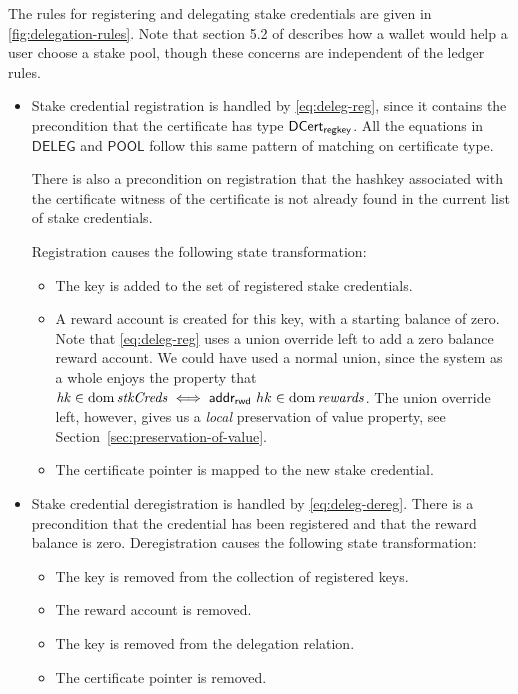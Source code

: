 The rules for registering and delegating stake credentials are given in
\cref{fig:delegation-rules}.  Note that section 5.2 of \cite{delegation_design}
describes how a wallet would help a user choose a stake pool, though these
concerns are independent of the ledger rules.

\begin{itemize}
\item Stake credential registration is handled by \cref{eq:deleg-reg}, since it
  contains the precondition that the certificate has type $\mathsf{DCert_{regkey}}$.  All
  the equations in $\mathsf{DELEG}$ and $\mathsf{POOL}$ follow this same pattern
  of matching on certificate type.

  There is also a precondition on registration that the hashkey associated with
  the certificate witness of the certificate is not already found in the current
  list of stake credentials.

    Registration causes the following state transformation:
    \begin{itemize}
    \item The key is added to the set of registered stake credentials.
      \item A reward account is created for this key, with a starting balance of zero.
        Note that \cref{eq:deleg-reg} uses a union override left to add
        a zero balance reward account.
        We could have used a normal union, since the system as a whole enjoys the property that
        $\var{hk}\in\dom{\var{stkCreds}}\iff \addrRw \var{hk}\in\dom{\var{rewards}}$.
        The union override left, however, gives us a \textit{local}
        preservation of value property, see Section~\cref{sec:preservation-of-value}.
      \item The certificate pointer is mapped to the new stake credential.
    \end{itemize}

  \item Stake credential deregistration is handled by \cref{eq:deleg-dereg}.
    There is a precondition that the credential has been registered and that
    the reward balance is zero.  Deregistration causes the following state
    transformation:
    \begin{itemize}
      \item The key is removed from the collection of registered keys.
      \item The reward account is removed.
      \item The key is removed from the delegation relation.
      \item The certificate pointer is removed.
    \end{itemize}


\end{itemize}
